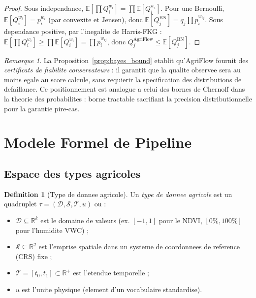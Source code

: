 \documentclass[12pt,a4paper]{article}
\theoremstyle{plain}
\theoremstyle{definition}
\newtheorem{definition}[theorem]{Definition}
\theoremstyle{remark}
\newtheorem{remark}[theorem]{Remarque}
\newcommand{\E}{\mathbb{E}}
\newcommand{\R}{\mathbb{R}}
\begin{document}
	\begin{proof}
		Sous independance, $\E[\prod Q_i^{w_i}] = \prod \E[Q_i^{w_i}]$.
		Pour une Bernoulli, $\E[Q_i^{w_i}] = p_i^{w_i}$ (par convexite et
		Jensen), donc $\E[Q_j^{\mathrm{BN}}] = q_j \prod p_i^{w_{ij}}$.
		Sous dependance positive, par l'inegalite de Harris-FKG
		\cite{fkg_inequality} : $\E[\prod Q_i^{w_i}] \geq \prod \E[Q_i^{w_i}]
		= \prod p_i^{w_{ij}}$, donc $Q_j^{\mathrm{AgriFlow}} \leq
		\E[Q_j^{\mathrm{BN}}]$.
	\end{proof}
	
	\begin{remark}
		La Proposition~\ref{prop:bayes_bound} etablit qu'AgriFlow fournit des
		\emph{certificats de fiabilite conservateurs} : il garantit que la
		qualite observee sera au moins egale au score calcule, sans requierir
		la specification des distributions de defaillance.
		Ce positionnement est analogue a celui des bornes de Chernoff
		dans la theorie des probabilites : borne tractable sacrifiant la
		precision distributionnelle pour la garantie pire-cas.
	\end{remark}
	
	\section{Modele Formel de Pipeline}
	\label{sec:formal}
	
	
	\subsection{Espace des types agricoles}
	\label{subsec:types}
	
	\begin{definition}[Type de donnee agricole]
		\label{def:type}
		Un \emph{type de donnee agricole} est un quadruplet
		$\tau = (\mathcal{D}, \mathcal{S}, \mathcal{T}, u)$ ou :
		\begin{itemize}[noitemsep]
			\item $\mathcal{D} \subseteq \R^k$ est le domaine de valeurs
			(ex. $[-1,1]$ pour le NDVI, $[0\%,100\%]$ pour l'humidite VWC) ;
			\item $\mathcal{S} \subseteq \R^2$ est l'emprise spatiale dans un
			systeme de coordonnees de reference (CRS) fixe ;
			\item $\mathcal{T} = [t_0,t_1] \subset \R^+$ est l'etendue temporelle ;
			\item $u$ est l'unite physique (element d'un vocabulaire standardise).
		\end{itemize}
	\end{definition}
	
\end{document}
